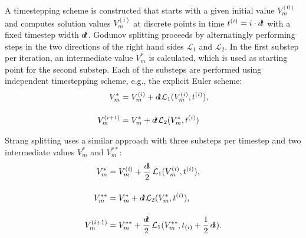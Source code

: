 A timestepping scheme is constructed that starts with a given initial value $V_m^{(0)}$ and computes solution values $V_m^{(i)}$ at discrete points in time $t^{(i)} = i\cdot\dt$ with a fixed timestep width $\dt$.
Godunov splitting proceeds by alternatingly performing steps in the two directions of the right hand sides $\mathcal{L}_1$ and $\mathcal{L}_2$. In the first substep per iteration, an intermediate value $V_m^{\ast}$ is calculated, which is used as starting point for the second substep. Each of the substeps are performed using independent timestepping scheme, e.g., the explicit Euler scheme:
%
\begin{subequations}\label{eq:monodomain_godunov}
  \begin{align}
    V_m^{\ast} &= V_m^{(i)} + \dt \mathcal{L}_1(V_m^{(i)},t^{(i)}),\\[4mm]
    V_m^{(i+1)} &= V_m^{\ast} + \dt \mathcal{L}_2(V_m^{\ast},t^{(i)})
  \end{align}
\end{subequations}

Strang splitting uses a similar approach with three substeps per timestep and two intermediate values $V_m^{\ast}$ and $V_m^{\ast\ast}$:
%
\begin{subequations}\label{eq:monodomain_strang}
  \begin{align}
    V_m^{\ast} &= V_m^{(i)} + \dfrac{\dt}{2} \mathcal{L}_1(V_m^{(i)},t^{(i)}),\\[4mm]
    V_m^{\ast\ast} &= V_m^{\ast} + \dt \mathcal{L}_2(V_m^{\ast},t^{(i)}),\\[4mm]
    V_m^{(i+1)} &= V_m^{\ast\ast} + \dfrac{\dt}{2} \mathcal{L}_1(V_m^{\ast\ast},t_{(i)}+\dfrac12 \dt).
  \end{align}
\end{subequations}
%

